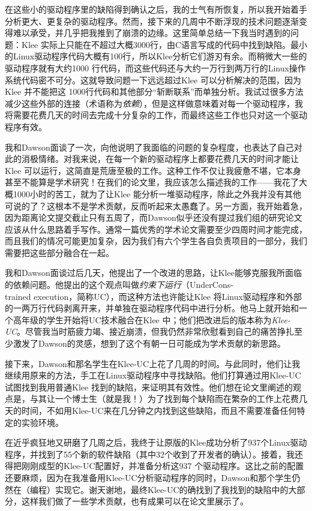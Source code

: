 \documentclass[letter,12pt]{book}
\begin{document}
\begin{CJK}{UTF8}{gbsn}
在这些小的驱动程序里的缺陷得到确认之后，我的士气有所恢复，所以我开始着手分析更大、更复杂的驱动程序。然而，接下来的几周中不断浮现的技术问题逐渐变得难以承受，并几乎把我推到了崩溃的边缘。这里简单总结一下我当时遇到的问题：Klee 实际上只能在不超过大概3000行，由C语言写成的代码中找到缺陷。最小的Linux驱动程序代码大概有100行，所以Klee分析它们游刃有余。而稍微大一些的驱动程序就有大约1000 行代码，而这些代码还与大约一万行到两万行的Linux操作系统代码密不可分。这就导致问题一下远远超过Klee 可以分析解决的范围，因为Klee 并不能把这
1000行代码和其他部分“斩断联系”而单独分析。我试过很多方法减少这些外部的连接（术语称为\emph{依赖}），但是这样做意味着对每一个驱动程序，我将需要花费几天的时间去完成十分复杂的工作，而最终这些工作也只对这一个驱动程序有效。

我和Dawson面谈了一次，向他说明了我面临的问题的复杂程度，也表达了自己对此的消极情绪。对我来说，在每一个新的驱动程序上都要花费几天的时间才能让Klee 可以运行，这简直是荒唐至极的工作。这种工作不仅让我疲惫不堪，它本身甚至不能算是学术研究！在我们的论文里，我应该怎么描述我的工作——我花了大概1000小时的苦工，就为了让Klee 能分析一堆驱动程序，除此之外我并没有其他可说的了？这根本不是学术贡献，反而听起来太愚蠢了。另一方面，我开始着急，因为距离论文提交截止只有五周了，而Dawson似乎还没有提过我们组的研究论文应该从什么思路着手写作。通常一篇优秀的学术论文需要至少四周时间才能完成，而且我们的情况可能更加复杂，因为我们有六个学生各自负责项目的一部分，我们需要把这些部分融合在一起。

我和Dawson面谈过后几天，他提出了一个改进的思路，让Klee能够克服我所面临的依赖问题。他提出的这个观点叫做\emph{约束下运行}（UnderCons-\\trained execution，简称UC），而这种方法也许能让Klee 将Linux驱动程序和外部的一两万行代码剥离开来，并单独在驱动程序代码中进行分析。他马上就开始和一个高年级的学生开始将UC技术融合在Klee 中；他们把改进后的版本称为\emph{Klee-UC}。尽管我当时筋疲力竭、接近崩溃，但我仍然非常欣慰看到自己的痛苦挣扎至少激发了Dawson的灵感，想到了这个有朝一日可能成为学术贡献的新思路。

接下来，Dawson和那名学生在Klee-UC上花了几周的时间。与此同时，他们让我继续用原来的方法，手工在Linux驱动程序中寻找缺陷。他们打算通过用Klee-UC试图找到我用普通Klee 找到的缺陷，来证明其有效性。他们想在论文里阐述的观点是，与其让一个博士生（就是我！）为了找到每个缺陷而在繁杂的工作上花费几天的时间，不如用Klee-UC来在几分钟之内找到这些缺陷，而且不需要准备任何特定的实验环境。

在近乎疯狂地又研磨了几周之后，我终于让原版的Klee成功分析了937个Linux驱动程序，并找到了55个新的软件缺陷（其中32个收到了开发者的确认）。接着，我还得把刚刚成型的Klee-UC配置好，并准备分析这937 个驱动程序。这比之前的配置还要麻烦，因为在我准备用Klee-UC分析驱动程序的同时，Dawson和那个学生仍然在（编程）实现它。谢天谢地，最终Klee-UC的确找到了我找到的缺陷中的大部分，这样我们做了一些学术贡献，也有成果可以在论文里展示了。


\end{CJK}
\end{document}
